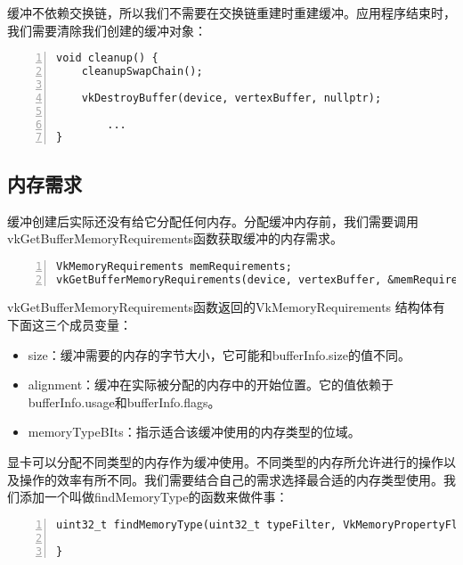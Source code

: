 \documentclass{ctexart}
\begin{document}
缓冲不依赖交换链，所以我们不需要在交换链重建时重建缓冲。应用程序结束时，我们需要清除我们创建的缓冲对象：

\begin{lstlisting}[language={[ANSI]C},keywordstyle=\color{blue!70},commentstyle=\color{red!50!green!50!blue!50},frame=shadowbox, rulesepcolor=\color{red!20!green!20!blue!20},basicstyle=\small,numbers=left, numberstyle=\tiny,breaklines=true]
void cleanup() {
	cleanupSwapChain();

	vkDestroyBuffer(device, vertexBuffer, nullptr);

		...
}
\end{lstlisting}

\subsection{内存需求}

缓冲创建后实际还没有给它分配任何内存。分配缓冲内存前，我们需要调用vkGetBufferMemoryRequirements函数获取缓冲的内存需求。

\begin{lstlisting}[language={[ANSI]C},keywordstyle=\color{blue!70},commentstyle=\color{red!50!green!50!blue!50},frame=shadowbox, rulesepcolor=\color{red!20!green!20!blue!20},basicstyle=\small,numbers=left, numberstyle=\tiny,breaklines=true]
VkMemoryRequirements memRequirements;
vkGetBufferMemoryRequirements(device, vertexBuffer, &memRequirements);
\end{lstlisting}

vkGetBufferMemoryRequirements函数返回的VkMemoryRequirements 结构体有下面这三个成员变量：

\begin{itemize}
	\item size：缓冲需要的内存的字节大小，它可能和bufferInfo.size的值不同。
	\item alignment：缓冲在实际被分配的内存中的开始位置。它的值依赖于bufferInfo.usage和bufferInfo.flags。
	\item memoryTypeBIts：指示适合该缓冲使用的内存类型的位域。
\end{itemize}

显卡可以分配不同类型的内存作为缓冲使用。不同类型的内存所允许进行的操作以及操作的效率有所不同。我们需要结合自己的需求选择最合适的内存类型使用。我们添加一个叫做findMemoryType的函数来做件事：

\begin{lstlisting}[language={[ANSI]C},keywordstyle=\color{blue!70},commentstyle=\color{red!50!green!50!blue!50},frame=shadowbox, rulesepcolor=\color{red!20!green!20!blue!20},basicstyle=\small,numbers=left, numberstyle=\tiny,breaklines=true]
uint32_t findMemoryType(uint32_t typeFilter, VkMemoryPropertyFlags properties) {

}
\end{lstlisting}
\end{document}
